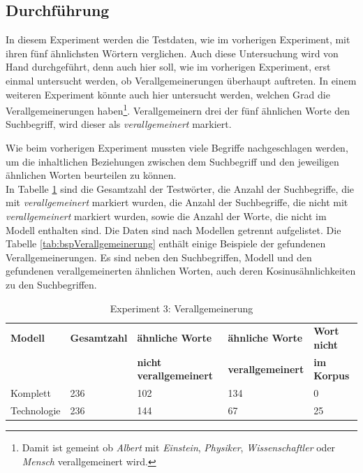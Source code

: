 \documentclass[12pt,a4paper]{report}
\begin{document}
		\subsection*{Durchführung}
		In diesem Experiment werden die Testdaten, wie im vorherigen Experiment, mit ihren fünf ähnlichsten Wörtern verglichen. Auch diese Untersuchung wird von Hand durchgeführt, denn auch hier soll, wie im vorherigen Experiment, erst einmal untersucht werden, ob Verallgemeinerungen überhaupt auftreten. In einem weiteren Experiment könnte auch hier untersucht werden, welchen Grad die Verallgemeinerungen haben\footnote{Damit ist gemeint ob \textit{Albert} mit \textit{Einstein}, \textit{Physiker}, \textit{Wissenschaftler} oder \textit{Mensch} verallgemeinert wird.}. Verallgemeinern drei der fünf ähnlichen Worte den Suchbegriff, wird dieser als \textit{verallgemeinert} markiert. 
		
		
		Wie beim vorherigen Experiment mussten viele Begriffe nachgeschlagen werden,  um die inhaltlichen Beziehungen zwischen dem Suchbegriff und den jeweiligen ähnlichen Worten beurteilen zu können.\\
		
In Tabelle \ref{tab:Experiment3} sind die Gesamtzahl der Testwörter, die Anzahl der Suchbegriffe, die mit \textit{verallgemeinert} markiert wurden, die Anzahl der Suchbegriffe,  die nicht mit \textit{verallgemeinert} markiert wurden, sowie die Anzahl der Worte, die nicht im Modell enthalten sind. Die Daten sind nach Modellen getrennt aufgelistet. Die Tabelle \ref{tab:bspVerallgemeinerung} enthält einige Beispiele der gefundenen Verallgemeinerungen. Es sind neben den Suchbegriffen, Modell und den gefundenen verallgemeinerten ähnlichen Worten, auch deren Kosinusähnlichkeiten zu den Suchbegriffen.
		
\begin{table}[H]
\caption{Experiment 3: Verallgemeinerung}
\label{tab:Experiment3}
\begin{center}
\begin{tabular}{|l||l|l|l|l|}
\hline
\textbf{Modell} & \textbf{Gesamtzahl}& \textbf{ähnliche Worte} & \textbf{ähnliche Worte}  & \textbf{Wort nicht} \\
 &  & \textbf{nicht verallgemeinert} & \textbf{verallgemeinert} &\textbf{ im Korpus} \\

\hline
\hline
 Komplett & 236 & 102 & 134 & 0  \\
 \hline
 Technologie & 236 & 144 & 67 & 25 \\
 \hline
 
\end{tabular}
\end{center}
\end{table}
\end{document}
